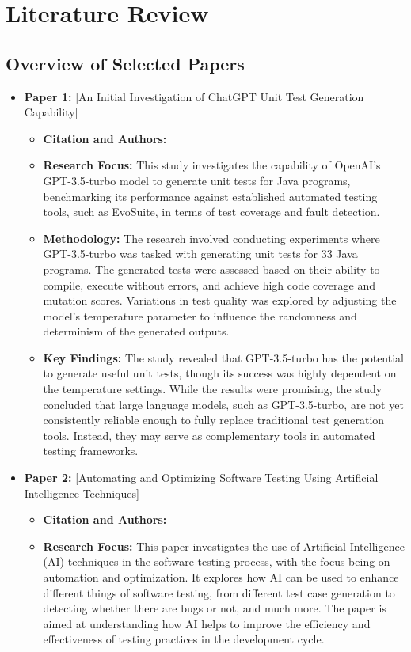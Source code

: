 \documentclass[12pt,a4paper]{article}
\begin{document}
\section{Literature Review}

\subsection{Overview of Selected Papers}
\begin{itemize}
    \item \textbf{Paper 1:} [An Initial Investigation of ChatGPT Unit Test Generation Capability]
    \begin{itemize}
        \item \textbf{Citation and Authors:} \citep{Guilherme23}
        \item \textbf{Research Focus:}  This study investigates the capability of OpenAI's GPT-3.5-turbo model to generate unit tests for Java programs, benchmarking its performance against established automated testing tools, such as EvoSuite, in terms of test coverage and fault detection.

        \item \textbf{Methodology:} The research involved conducting experiments where GPT-3.5-turbo was tasked with generating unit tests for 33 Java programs. The generated tests were assessed based on their ability to compile, execute without errors, and achieve high code coverage and mutation scores. Variations in test quality was explored by adjusting the model’s temperature parameter to influence the randomness and determinism of the generated outputs.

        \item \textbf{Key Findings:} The study revealed that GPT-3.5-turbo has the potential to generate useful unit tests, though its success was highly dependent on the temperature settings. While the results were promising, the study concluded that large language models, such as GPT-3.5-turbo, are not yet consistently reliable enough to fully replace traditional test generation tools. Instead, they may serve as complementary tools in automated testing frameworks.

    \end{itemize}
    \vspace{0.2cm}
    \item \textbf{Paper 2:} [Automating and Optimizing Software Testing Using Artificial Intelligence Techniques]
    \begin{itemize}
        \item \textbf{Citation and Authors:} \citep{Minimol21}
        \item \textbf{Research Focus:}  This paper investigates the use of Artificial Intelligence (AI) techniques in the software testing process, with the focus being on automation and optimization. It explores how AI can be used to enhance different things of software testing, from different test case generation to detecting whether there are bugs or not, and much more. The paper is aimed at understanding how AI helps to improve the efficiency and effectiveness of testing practices in the development cycle.


\end{itemize}
\end{itemize}
\end{document}

